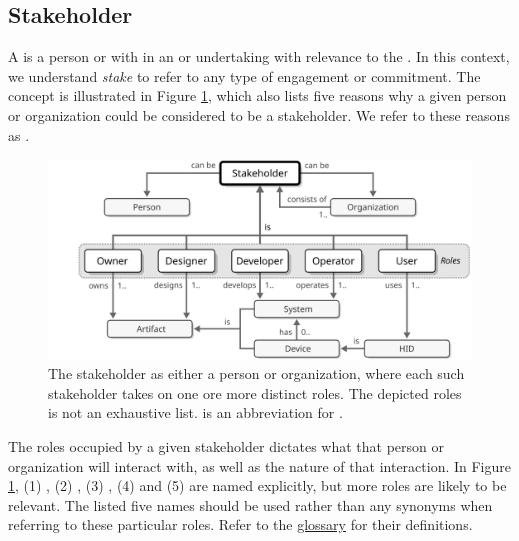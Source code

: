 \subsection{Stakeholder}
\label{sec:reference-model:stakeholder}

A  is a person or  with  in an  or undertaking with relevance to the .
In this context, we understand \textit{stake} to refer to any type of engagement or commitment.
The concept is illustrated in Figure \ref{fig:stakeholder}, which also lists five reasons why a given person or organization could be considered to be a stakeholder.
We refer to these reasons as .

\begin{figure}[ht!]
  \centering
  \includegraphics[scale=0.9]{figures/stakeholder}
  \caption{
    The stakeholder as either a person or organization, where each such stakeholder takes on one ore more distinct roles.
    The depicted roles is not an exhaustive list.
     is an abbreviation for .
  }
  \label{fig:stakeholder}
\end{figure}

The roles occupied by a given stakeholder dictates what  that person or organization will interact with, as well as the nature of that interaction.
In Figure \ref{fig:stakeholder}, (1) , (2) , (3) , (4)  and (5)  are named explicitly, but more roles are likely to be relevant.
The listed five names should be used rather than any synonyms when referring to these particular roles.
Refer to the \hyperref[sec:glossary]{glossary} for their definitions.

